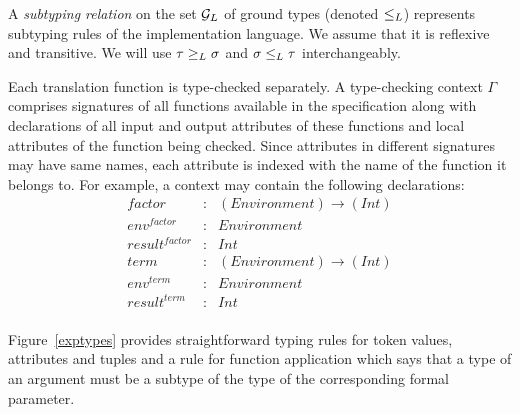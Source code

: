 \documentclass{informat} %
\newcommand{\figref}[1]{Figure~\ref{#1}}
\begin{document}
A \emph{subtyping relation} on the set ${\mathcal{G}_L}$ of ground types (denoted $\le_L$) represents subtyping rules of the implementation language. We assume that it is reflexive and transitive. We will use $\tau \ge_L \sigma$ and $\sigma \le_L \tau$ interchangeably.

Each translation function is type-checked separately. A type-checking context $\Gamma$ comprises signatures of all functions available in the specification along with declarations of all input and output attributes of these functions and local attributes of the function being checked. Since attributes in different signatures may have same names, each attribute is indexed with the name of the function it belongs to. For example, a context may contain the following declarations:\\
$$\begin{array}{rcl}
factor&:& (Environment) \rightarrow (Int)\\
env^{factor} &:& Environment\\
result^{factor} &:& Int\\
term &:& (Environment) \rightarrow (Int)\\
env^{term} &:& Environment\\
result^{term} &:& Int\\
\end{array}$$

\figref{exptypes} provides straightforward typing rules for token values, attributes and tuples and a rule for function application which says that a type of an argument must be a subtype of the type of the corresponding formal parameter.

\newcommand{\trule}[3]{%
\dfrac{#1}{#2}(\mbox{\textsc{#3}})
}
\end{document}
